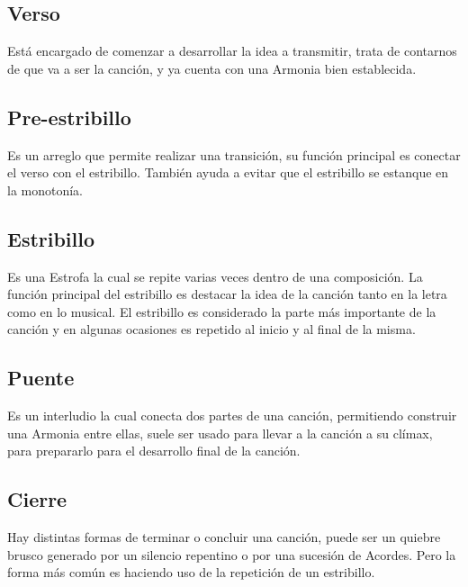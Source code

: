 \documentclass[12pt, a4paper, titlepage]{report}
\begin{document}
			\subsection{Verso}
			Está encargado de comenzar a desarrollar la idea a transmitir, trata de contarnos de que va a ser la canción, y ya cuenta con una \Gls{Armonia}  bien establecida.\par
			\subsection{Pre-estribillo}
			Es un arreglo que permite realizar una transición, su función principal es conectar el verso con el estribillo. También ayuda a evitar que el estribillo se estanque en la monotonía.\par
			\subsection{Estribillo}
			Es una \Gls{Estrofa} la cual se repite varias veces dentro de una composición. La función principal del estribillo es destacar la idea de la canción tanto en la letra como en lo musical. El estribillo es considerado la parte más importante de la canción y en algunas ocasiones es repetido al inicio y al final de la misma.\par
			\subsection{Puente}
			Es un interludio la cual conecta dos partes de una canción, permitiendo construir una \Gls{Armonia}  entre ellas, suele ser usado para llevar a la canción a su clímax, para prepararlo para el desarrollo final de la canción.\par
			\subsection{Cierre}
			Hay distintas formas de terminar o concluir una canción, puede ser un quiebre brusco generado por un silencio repentino o por una sucesión de \Gls{Acordes}. Pero la forma más común es haciendo uso de la repetición de un estribillo.\par
\end{document}
